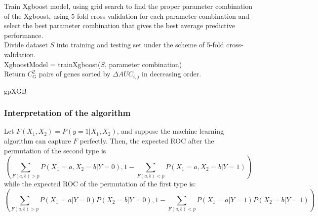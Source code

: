 \documentclass[11pt]{article}
\theoremstyle{plain}
\theoremstyle{definition}
\theoremstyle{remark}
\begin{document}
\begin{algorithm}[H]
\SetAlgoLined
{}
Train Xgboost model, using grid search to find the proper parameter combination of the Xgboost, using 5-fold cross validation for each parameter combination and select the best parameter combination that gives the best average predictive performance.\\
Divide dataset $S$ into training and testing set under the scheme of 5-fold cross-validation.\\
XgboostModel = trainXgboost($S$, parameter combination)\\
Return $C^2_G$ pairs of genes sorted by $\Delta AUC_{i,j}$ in decreasing order.
 \caption{gpXGB}
\end{algorithm}

\subsubsection{Interpretation of the algorithm}

Let $F(X_1,X_2)=P(y=1|X_1,X_2)$, and suppose the machine learning algorithm can capture $F$ perfectly. Then, the expected ROC after the permutation of the second type is
\begin{equation}
\left(\sum_{F(a,b)>p}P(X_1=a,X_2=b|Y=0),1-\sum_{F(a,b)<p}P(X_1=a,X_2=b|Y=1)\right)
\end{equation}
while the expected ROC of the permutation of the first type is:
\begin{equation}
\left(\sum_{F(a,b)>p}P(X_1=a|Y=0)P(X_2=b|Y=0),1-\sum_{F(a,b)<p}P(X_1=a|Y=1)P(X_2=b|Y=1)\right)
\end{equation}
\end{document}
